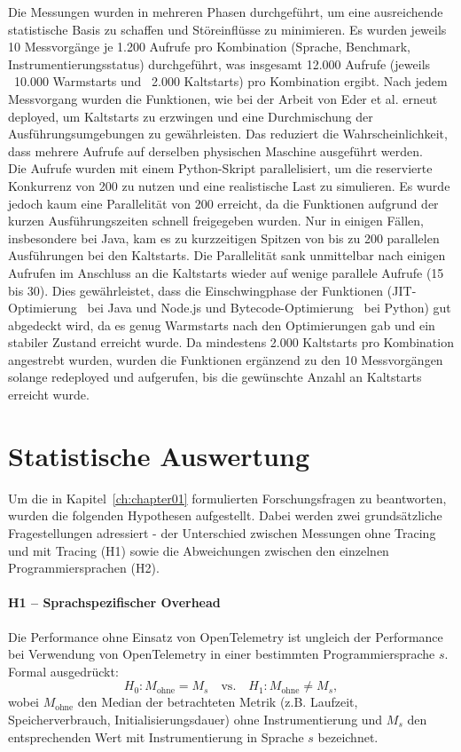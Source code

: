 Die Messungen wurden in mehreren Phasen durchgeführt, um eine ausreichende statistische Basis zu schaffen und 
Störeinflüsse zu minimieren. Es wurden jeweils 10 Messvorgänge je 1.200 Aufrufe pro Kombination (Sprache, Benchmark, 
Instrumentierungsstatus) durchgeführt, was insgesamt 12.000 Aufrufe (jeweils ~10.000 Warmstarts und ~2.000 Kaltstarts) pro 
Kombination ergibt. Nach jedem Messvorgang wurden die Funktionen, wie bei der Arbeit von Eder et al. \cite{10254754} erneut deployed, 
um Kaltstarts zu erzwingen und eine Durchmischung der Ausführungsumgebungen zu gewährleisten. Das 
reduziert die Wahrscheinlichkeit, dass mehrere Aufrufe auf derselben physischen Maschine ausgeführt werden. 
\\Die Aufrufe wurden mit einem Python-Skript parallelisiert, 
um die reservierte Konkurrenz von 200 zu nutzen und eine realistische Last zu simulieren. Es wurde jedoch kaum eine Parallelität 
von 200 erreicht, da die Funktionen aufgrund der kurzen Ausführungszeiten schnell freigegeben wurden. Nur in einigen Fällen, 
insbesondere bei Java, kam es zu kurzzeitigen Spitzen von bis zu 200 parallelen Ausführungen bei den Kaltstarts. Die Parallelität sank 
unmittelbar nach einigen Aufrufen im Anschluss an die Kaltstarts wieder auf wenige parallele Aufrufe (15 bis 30). Dies gewährleistet, 
dass die Einschwingphase der Funktionen (\ac{JIT}-Optimierung~\cite{FromWarmToHotStarts} bei Java und Node.js und Bytecode-Optimierung~\cite{CPythonPEP659} bei Python) 
gut abgedeckt wird, da es genug Warmstarts nach den Optimierungen gab und ein stabiler Zustand erreicht wurde. Da mindestens 
2.000 Kaltstarts pro Kombination angestrebt wurden, wurden die Funktionen ergänzend zu den 10 Messvorgängen solange redeployed und 
aufgerufen, bis die gewünschte Anzahl an Kaltstarts erreicht wurde.

\section{Statistische Auswertung}
\label{sec:auswertung}

Um die in Kapitel~\ref{ch:chapter01} formulierten Forschungsfragen zu beantworten, wurden die folgenden Hypothesen aufgestellt. 
Dabei werden zwei grundsätzliche Fragestellungen adressiert - der Unterschied zwischen Messungen ohne Tracing und mit Tracing (H1) 
sowie die Abweichungen zwischen den einzelnen Programmiersprachen (H2).

\paragraph{H1 – Sprachspezifischer Overhead}
Die Performance ohne Einsatz von OpenTelemetry ist ungleich der Performance bei Verwendung von OpenTelemetry in einer bestimmten Programmiersprache \(s\). Formal ausgedrückt:
\[
H_0: M_{\text{ohne}} = M_s \quad \text{vs.} \quad H_1: M_{\text{ohne}} \neq M_s,
\]
wobei \(M_{\text{ohne}}\) den Median der betrachteten Metrik (z.B. Laufzeit, Speicherverbrauch, Initialisierungsdauer) ohne Instrumentierung und \(M_s\) den entsprechenden Wert mit Instrumentierung in Sprache \(s\) bezeichnet.


